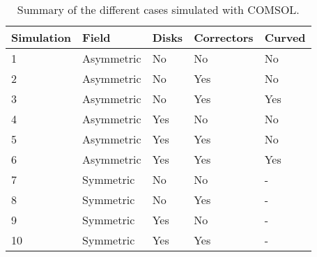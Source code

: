\begin{table}[!h]
  \centering
  \caption[Summary of the different cases simulated with COMSOL]{Summary of the different cases simulated with COMSOL.}
  \label{anx:tab:recap_simu}
  \begin{tabularx}{\linewidth}{lXXXX}
    \toprule
    Simulation & Field      & Disks & Correctors & Curved \\
    \midrule
    1          & Asymmetric & No    & No         & No     \\
    2          & Asymmetric & No    & Yes        & No     \\
    3          & Asymmetric & No    & Yes        & Yes    \\
    4          & Asymmetric & Yes   & No         & No     \\
    5          & Asymmetric & Yes   & Yes        & No     \\
    6          & Asymmetric & Yes   & Yes         & Yes    \\
    7          & Symmetric  & No    & No         & -      \\
    8          & Symmetric  & No    & Yes        & -      \\
    9          & Symmetric  & Yes   & No         & -      \\
    10         & Symmetric  & Yes   & Yes        & -      \\
    \bottomrule
  \end{tabularx}
\end{table}